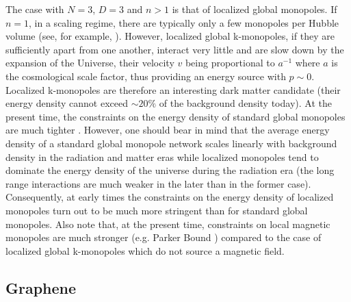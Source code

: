 \documentclass[prd,twocolumn,a4paper,superscriptaddress,floatfix]{revtex4}
\begin{document}
The case with $N=3$, $D=3$ and $n>1$ is that of localized global monopoles. If $n=1$, in a scaling regime, there are typically only a few monopoles per Hubble volume (see, for example, \cite{Bennett:1990xy,Pen:1993nx}). However, localized global k-monopoles, if they are sufficiently apart from one another, interact very little and are slow down by the expansion of the Universe, their velocity $v$ being proportional to $a^{-1}$ where $a$ is the cosmological scale factor, thus providing an energy source with $p \sim 0$. Localized k-monopoles  are therefore an interesting dark matter candidate (their energy density cannot exceed $\sim 20 \%$ of the background density today). At the present time, the constraints on the energy density of standard global monopoles are much tighter \cite{1997PhRvL..79.1611P}. However, one should bear in mind that the average energy density of a standard global monopole network scales linearly with background density in the radiation and matter eras while localized monopoles tend to dominate the energy density of the universe during the radiation era (the long range interactions are much weaker in the later than in the former case).  Consequently, at early times the constraints on the energy density of localized monopoles turn out to be much more stringent than for standard global monopoles. Also note that, at the present time, constraints on local magnetic monopoles are much stronger (e.g. Parker Bound \cite{1970ApJ...160..383P}) compared to the case of localized global k-monopoles which do not source a magnetic field.

\subsection{Graphene}
\end{document}
